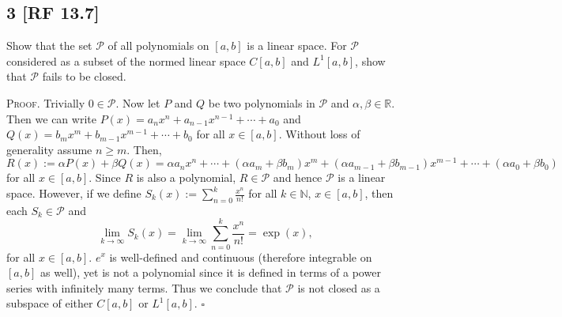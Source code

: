 \documentclass[12pt]{article}
\newcounter{ProofCounter}
\newenvironment{Proof}{\stepcounter{ProofCounter}\textsc{Proof.}}{\hfill$\square$}
\begin{document}
\subsection*{3 [RF 13.7]}
\begin{tcolorbox}
  Show that the set $\mathcal{P}$ of all polynomials on $[a,b]$ is a linear space. For $\mathcal{P}$ considered as a subset of the normed linear
  space $C[a,b]$ and $L^{1}[a,b]$, show that $\mathcal{P}$ fails to be closed.
\end{tcolorbox}
\begin{Proof}
  Trivially $0 \in \mathcal{P}$. Now let $P$ and $Q$ be two polynomials in $\mathcal{P}$ and $\alpha,\beta \in \mathbb{R}$. Then we can write 
  $P(x) = a_n x^{n} + a_{n-1}x^{n-1} + \cdots + a_{0}$ and $Q(x) = b_{m} x^{m} + b_{m-1}x^{m-1} + \cdots + b_{0}$
  for all $x \in [a,b]$. Without loss of generality assume $n \geq m$. Then,
  \[ 
    R(x) := \alpha P(x) + \beta Q(x) = \alpha a_n x^{n} + \cdots + (\alpha a_{m} + \beta b_{m})x^{m} + (\alpha a_{m-1} + \beta b_{m-1})x^{m-1} + \cdots +
    (\alpha a_0 + \beta b_0)
  \]
  for all $x \in [a,b]$. Since $R$ is also a polynomial, $R \in \mathcal{P}$ and hence $\mathcal{P}$ is a linear space. However, if we define $S_k(x) :=
  \sum_{n=0}^{k}\frac{x^{n}}{n!}$ for all $k \in \mathbb{N}$, $x \in [a,b]$, then each $S_k \in \mathcal{P}$ and 
  \[ 
    \lim_{k\rightarrow\infty}S_k(x) = \lim_{k\rightarrow\infty}\sum_{n=0}^{k}\frac{x^{n}}{n!} = \exp(x),
  \]
  for all $x \in [a,b]$. $e^{x}$ is well-defined and continuous (therefore integrable on $[a,b]$ as well), yet is not a polynomial since it is 
  defined in terms of a power series with infinitely many
  terms. Thus we conclude that $\mathcal{P}$ is not closed as a subspace of either $C[a,b]$ or $L^{1}[a,b]$.
\end{Proof}
\end{document}
